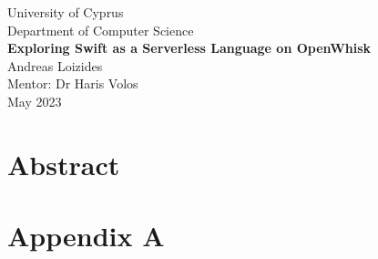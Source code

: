 \documentclass[a4paper,12pt,openright,twoside]{report}
\begin{document}
\begin{titlepage}
    \centering
    \vspace*{1in}
    \large University of Cyprus \\
    Department of Computer Science \\
    \vspace*{2in}
    \LARGE \textbf{Exploring Swift as a Serverless Language on OpenWhisk} \\
    \vspace*{1in}
    \large Andreas Loizides \\
    \vspace*{0.5in}
    \large Mentor: Dr Haris Volos \\
    \vfill
    \large May 2023 \\
\end{titlepage}

\newpage


\newpage
\chapter*{Abstract}
\lipsum[1] %

\newpage
\tableofcontents














\newpage
{}
%



\newpage
\appendix
\chapter{Appendix A}
\lipsum[1-2]
\end{document}
